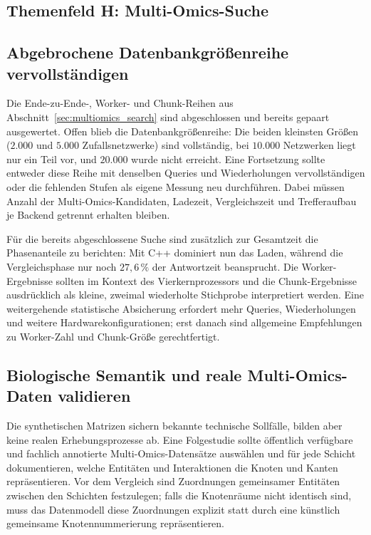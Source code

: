 \documentclass[a4paper,12pt, twoside]{report}
\theoremstyle{definition}
\begin{document}
\subsection*{Themenfeld H: Multi-Omics-Suche}

\subsection{Abgebrochene Datenbankgrößenreihe vervollständigen}
\label{sec:multiomics_ausblick_benchmark}

Die Ende-zu-Ende-, Worker- und Chunk-Reihen aus Abschnitt~\ref{sec:multiomics_search} sind abgeschlossen und bereits gepaart ausgewertet. Offen blieb die Datenbankgrößenreihe: Die beiden kleinsten Größen ($2.000$ und $5.000$ Zufallsnetzwerke) sind vollständig, bei $10.000$ Netzwerken liegt nur ein Teil vor, und $20.000$ wurde nicht erreicht. Eine Fortsetzung sollte entweder diese Reihe mit denselben Queries und Wiederholungen vervollständigen oder die fehlenden Stufen als eigene Messung neu durchführen. Dabei müssen Anzahl der Multi-Omics-Kandidaten, Ladezeit, Vergleichszeit und Trefferaufbau je Backend getrennt erhalten bleiben.

Für die bereits abgeschlossene Suche sind zusätzlich zur Gesamtzeit die Phasenanteile zu berichten: Mit C++ dominiert nun das Laden, während die Vergleichsphase nur noch $27{,}6\,\%$ der Antwortzeit beansprucht. Die Worker-Ergebnisse sollten im Kontext des Vierkernprozessors und die Chunk-Ergebnisse ausdrücklich als kleine, zweimal wiederholte Stichprobe interpretiert werden. Eine weitergehende statistische Absicherung erfordert mehr Queries, Wiederholungen und weitere Hardwarekonfigurationen; erst danach sind allgemeine Empfehlungen zu Worker-Zahl und Chunk-Größe gerechtfertigt.

\subsection{Biologische Semantik und reale Multi-Omics-Daten validieren}
\label{sec:multiomics_ausblick_biologie}

Die synthetischen Matrizen sichern bekannte technische Sollfälle, bilden aber keine realen Erhebungsprozesse ab. Eine Folgestudie sollte öffentlich verfügbare und fachlich annotierte Multi-Omics-Datensätze auswählen und für jede Schicht dokumentieren, welche Entitäten und Interaktionen die Knoten und Kanten repräsentieren. Vor dem Vergleich sind Zuordnungen gemeinsamer Entitäten zwischen den Schichten festzulegen; falls die Knotenräume nicht identisch sind, muss das Datenmodell diese Zuordnungen explizit statt durch eine künstlich gemeinsame Knotennummerierung repräsentieren.
\end{document}
